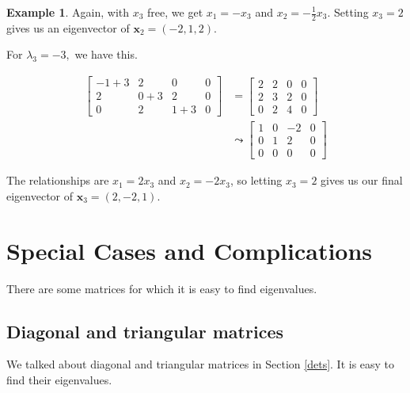 \documentclass[
]{book}
\theoremstyle{definition}
\theoremstyle{definition}
\newtheorem{example}{Example}[chapter]
\theoremstyle{definition}
\theoremstyle{definition}
\theoremstyle{remark}
\begin{document}
\begin{examplebox}
\begin{example}
Again, with \(x_3\) free, we get \(x_1=-x_3\) and \(x_2=-\frac{1}{2}x_3.\) Setting \(x_3=2\) gives us an eigenvector of \(\mathbf{x}_2=(-2,1,2)\).

For \(\lambda_3=-3,\) we have this.

\begin{align*}
\left[\begin{array}{ccc|c}-1+3 & 2 & 0&0\\2 & 0+3 & 2&0\\0 & 2 & 1+3&0\end{array}\right]&=\left[\begin{array}{ccc|c} 2 & 2 & 0&0\\2 & 3 & 2&0\\0 & 2 & 4&0\end{array}\right] \\
&\leadsto \left[\begin{array}{ccc|c} 1 & 0 & -2 &0\\0 & 1 & 2&0\\0 & 0 & 0&0\end{array}\right]
\end{align*}

The relationships are \(x_1=2x_3\) and \(x_2=-2x_3\), so letting \(x_3=2\) gives us our final eigenvector of \(\mathbf{x}_3=(2,-2,1).\)
\end{example}

\end{examplebox}

\section{Special Cases and Complications}\label{special-cases-and-complications}

There are some matrices for which it is easy to find eigenvalues.

\subsection*{Diagonal and triangular matrices}\label{diagonal-and-triangular-matrices}

We talked about diagonal and triangular matrices in Section \ref{dets}. It is easy to find their eigenvalues.
\end{document}

